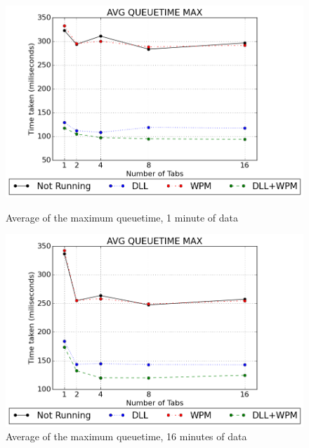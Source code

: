 \begin{figure}[!htbp]
	\centering
    \includegraphics[width=\textwidth,height=0.45\textheight,keepaspectratio]{Evaluation/experiment1/AVG-QUEUETIME-MAX-1.png}
    \caption{Average of the maximum queuetime, 1 minute of data}
    \label{fig:ex1_avgqueuetimemax_1}

	\vspace*{\floatsep}

    \includegraphics[width=\textwidth,height=0.45\textheight,keepaspectratio]{Evaluation/experiment1/AVG-QUEUETIME-MAX-16.png}
    \caption{Average of the maximum queuetime, 16 minutes of data}
    \label{fig:ex1_avgqueuetimemax_16}
\end{figure}
